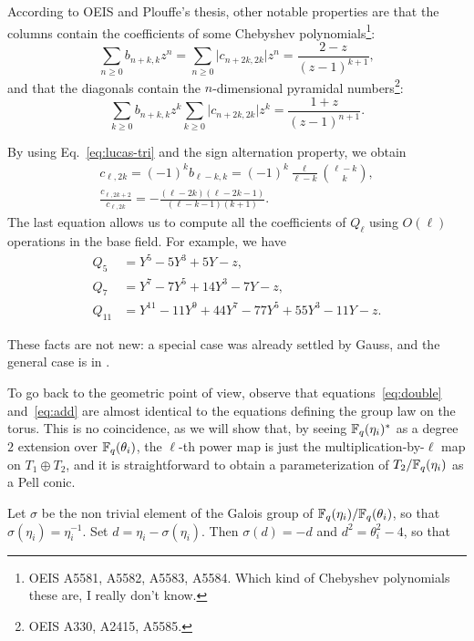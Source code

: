 \documentclass[11pt]{article}
\begin{document}
According to OEIS and Plouffe's thesis, other notable properties are
that the columns contain the coefficients of some Chebyshev
polynomials\footnote{OEIS A5581, A5582, A5583, A5584. Which kind of
  Chebyshev polynomials these are, I really don't know.}:
\begin{equation}
  \sum_{n\ge0}b_{n+k,k}z^n = \sum_{n\ge0}\lvert c_{n+2k,2k}\rvert z^n = \frac{2-z}{(z-1)^{k+1}},
\end{equation}
and that the diagonals contain the $n$-dimensional pyramidal
numbers\footnote{OEIS A330, A2415, A5585.}:
\begin{equation}
  \sum_{k\ge0} b_{n+k,k}z^k \sum_{k\ge0} \lvert c_{n+2k,2k} \rvert z^k =
  \frac{1+z}{(z-1)^{n+1}}.
\end{equation}

By using Eq.~\eqref{eq:lucas-tri} and the sign alternation property,
we obtain 
\begin{gather}
  c_{\ell,2k} = (-1)^kb_{\ell-k,k} = (-1)^k\frac{\ell}{\ell-k}\binom{\ell-k}{k},\\
  \frac{c_{\ell,2k+2}}{c_{\ell,2k}} = 
  -\frac{(\ell-2k)(\ell-2k-1)}{(\ell-k-1)(k+1)}.
\end{gather}
The last equation allows us to compute all the coefficients of
$Q_\ell$ using $O(\ell)$ operations in the base field. For example, we
have
\begin{align}
  Q_5 &= Y^5 - 5Y^3 + 5Y - z,\\
  Q_7 &= Y^7 - 7Y^5 + 14Y^3 - 7Y - z,\\
  Q_{11} &= Y^{11} - 11Y^9 + 44Y^7 - 77Y^5 + 55Y^3 - 11Y - z.
\end{align}

These facts are not new: a special case was already settled by Gauss,
and the general case is in \cite[Proposition~1]{gurak06}.

To go back to the geometric point of view, observe that
equations~\eqref{eq:double} and~\eqref{eq:add} are almost identical to
the equations defining the group law on the torus. This is no
coincidence, as we will show that, by seeing $\mathbb{F}_q(\eta_i)^\ast$ as a
degree $2$ extension over $\mathbb{F}_q(\theta_i)$, the $\ell$-th power map is
just the multiplication-by-$\ell$ map on $T_1\oplus T_2$, and it is
straightforward to obtain a parameterization of $T_2/\mathbb{F}_q(\eta_i)$ as
a Pell conic.

Let $\sigma$ be the non trivial element of the Galois group of
$\mathbb{F}_q(\eta_i)/\mathbb{F}_q(\theta_i)$, so that
$\sigma(\eta_i)=\eta_i^{-1}$. Set $d = \eta_i - \sigma(\eta_i)$. Then
$\sigma(d)=-d$ and $d^2 = \theta_i^2-4$, so that
\end{document}
